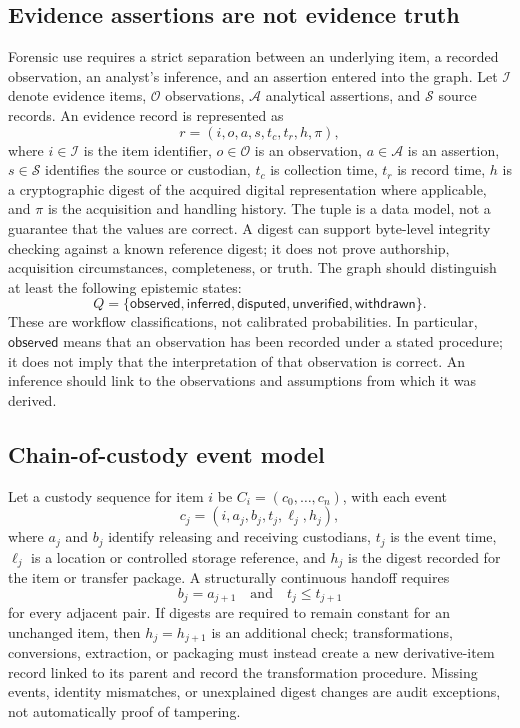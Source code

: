 \documentclass[11pt]{article}
\begin{document}
\subsection{Evidence assertions are not evidence truth}
Forensic use requires a strict separation between an underlying item, a recorded observation, an analyst's inference, and an assertion entered into the graph. Let $\mathcal{I}$ denote evidence items, $\mathcal{O}$ observations, $\mathcal{A}$ analytical assertions, and $\mathcal{S}$ source records. An evidence record is represented as
\[
r=(i,o,a,s,t_c,t_r,h,\pi),
\]
where $i\in\mathcal{I}$ is the item identifier, $o\in\mathcal{O}$ is an observation, $a\in\mathcal{A}$ is an assertion, $s\in\mathcal{S}$ identifies the source or custodian, $t_c$ is collection time, $t_r$ is record time, $h$ is a cryptographic digest of the acquired digital representation where applicable, and $\pi$ is the acquisition and handling history. The tuple is a data model, not a guarantee that the values are correct. A digest can support byte-level integrity checking against a known reference digest; it does not prove authorship, acquisition circumstances, completeness, or truth.
The graph should distinguish at least the following epistemic states:
\[
Q=\{\textsf{observed},\textsf{inferred},\textsf{disputed},
\textsf{unverified},\textsf{withdrawn}\}.
\]
These are workflow classifications, not calibrated probabilities. In particular, $\textsf{observed}$ means that an observation has been recorded under a stated procedure; it does not imply that the interpretation of that observation is correct. An inference should link to the observations and assumptions from which it was derived.
\subsection{Chain-of-custody event model}
Let a custody sequence for item $i$ be $C_i=(c_0,\ldots,c_n)$, with each event
\[
c_j=(i,a_j,b_j,t_j,\ell_j,h_j),
\]
where $a_j$ and $b_j$ identify releasing and receiving custodians, $t_j$ is the event time, $\ell_j$ is a location or controlled storage reference, and $h_j$ is the digest recorded for the item or transfer package. A structurally continuous handoff requires
\[
b_j=a_{j+1}\quad\text{and}\quad t_j\leq t_{j+1}
\]
for every adjacent pair. If digests are required to remain constant for an unchanged item, then $h_j=h_{j+1}$ is an additional check; transformations, conversions, extraction, or packaging must instead create a new derivative-item record linked to its parent and record the transformation procedure. Missing events, identity mismatches, or unexplained digest changes are audit exceptions, not automatically proof of tampering.
\end{document}

